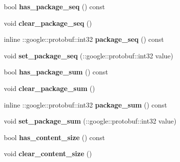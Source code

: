 \begin{DoxyCompactItemize}
bool {\bfseries has\+\_\+package\+\_\+seq} () const
\item 
\mbox{\label{classruntime_1_1FileSendProtos_a8bf9f5c55639462402e25d7f27ccfc52}} 
void {\bfseries clear\+\_\+package\+\_\+seq} ()
\item 
\mbox{\label{classruntime_1_1FileSendProtos_a43e8b4ea7500c98b38191c25b6605d32}} 
inline \+::google\+::protobuf\+::int32 {\bfseries package\+\_\+seq} () const
\item 
\mbox{\label{classruntime_1_1FileSendProtos_a1c706b3d20f9aa60a2f55ea0bccca84d}} 
void {\bfseries set\+\_\+package\+\_\+seq} (\+::google\+::protobuf\+::int32 value)
\item 
\mbox{\label{classruntime_1_1FileSendProtos_a27188fb48fb4fbc10972efd2fa2a2c87}} 
bool {\bfseries has\+\_\+package\+\_\+sum} () const
\item 
\mbox{\label{classruntime_1_1FileSendProtos_a24fd1a897af8a765f7b2435a31f79345}} 
void {\bfseries clear\+\_\+package\+\_\+sum} ()
\item 
\mbox{\label{classruntime_1_1FileSendProtos_a0e3a237d0e6412853a4422011a70009e}} 
inline \+::google\+::protobuf\+::int32 {\bfseries package\+\_\+sum} () const
\item 
\mbox{\label{classruntime_1_1FileSendProtos_a8fcdc7e7c0018931b85a1256d7c5b7ea}} 
void {\bfseries set\+\_\+package\+\_\+sum} (\+::google\+::protobuf\+::int32 value)
\item 
\mbox{\label{classruntime_1_1FileSendProtos_aae9ce0b0201e056d933a1dccd4c62d72}} 
bool {\bfseries has\+\_\+content\+\_\+size} () const
\item 
\mbox{\label{classruntime_1_1FileSendProtos_ab31e53ebe582474f2c3a1e60090341b7}} 
void {\bfseries clear\+\_\+content\+\_\+size} ()
\item 
\mbox{\label{classruntime_1_1FileSendProtos_a2c5b2832cfd76029d9897798f1f3e59d}} 

\end{DoxyCompactItemize}
